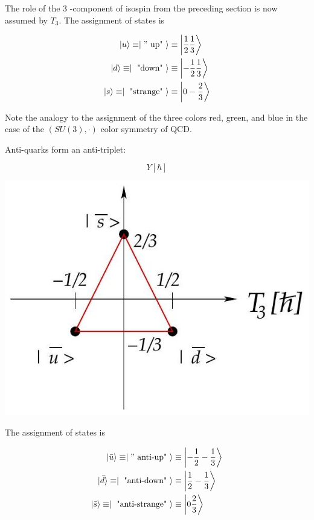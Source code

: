 \documentclass[10pt, letterpaper]{article}
\begin{document}
The role of the 3 -component of isospin from the preceding section is now assumed by $T_{3}$. The assignment of states is

$$
\begin{aligned}
|u\rangle \equiv \mid " \text { up" }\rangle & \equiv\left|\frac{1}{2} \frac{1}{3}\right\rangle \\
|d\rangle \equiv \mid \text { "down" }\rangle & \equiv\left|-\frac{1}{2} \frac{1}{3}\right\rangle \\
|s\rangle \equiv \mid \text { "strange" }\rangle & \equiv\left|0-\frac{2}{3}\right\rangle
\end{aligned}
$$

Note the analogy to the assignment of the three colors red, green, and blue in the case of the $(S U(3), \cdot)$ color symmetry of QCD.

Anti-quarks form an anti-triplet:

$$
Y[\hbar]
$$

\begin{center}
\includegraphics[scale=0.3]{2025_05_20_8618f55a41bfe980b4b2g-68}
\end{center}

The assignment of states is

$$
\begin{aligned}
|\bar{u}\rangle \equiv \mid " \text { anti-up" }\rangle & \equiv\left|-\frac{1}{2}-\frac{1}{3}\right\rangle \\
|\bar{d}\rangle \equiv \mid \text { "anti-down" }\rangle & \equiv\left|\frac{1}{2}-\frac{1}{3}\right\rangle \\
|\bar{s}\rangle \equiv \mid \text { "anti-strange" }\rangle & \equiv\left|0 \frac{2}{3}\right\rangle
\end{aligned}
$$
\end{document}
